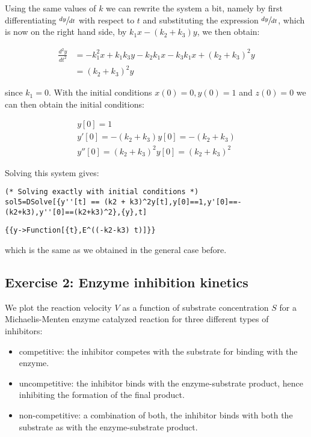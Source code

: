 \documentclass[11pt,a4paper,onecolumn]{article}
\begin{document}
Using the same values of $k$ we can rewrite the system a bit, namely by first differentiating $\sfrac{dy}{dt}$ with respect to $t$ and substituting the expression $\sfrac{dy}{dt}$, which is now on the right hand side, by $k_1 x - (k_2 + k_3) y$, we then obtain:

\begin{align*}
  \frac{d^2 y}{dt^2} &= -k_1^2 x + k_1 k_3 y - k_2 k_1 x - k_3 k_1 x + (k_2 + k_3)^2 y \nonumber \\
  &= (k_2 + k_3)^2 y
\end{align*}

since $k_1 = 0$. With the initial conditions $x(0) = 0, y(0) = 1$ and $z(0) = 0$ we can then obtain the initial conditions:

\begin{align*}
  y[0] = 1 \nonumber \\
  y'[0] = - (k_2 + k_3) y[0] = - (k_2 + k_3) \nonumber \\
  y''[0] = (k_2 + k_3)^2 y[0] = (k_2 + k_3)^2
\end{align*}

Solving this system gives:

\begin{lstlisting}[mathescape]
(* Solving exactly with initial conditions *)
sol5=DSolve[{y''[t] == (k2 + k3)^2y[t],y[0]==1,y'[0]==-(k2+k3),y''[0]==(k2+k3)^2},{y},t] 
\end{lstlisting}

\begin{lstlisting}[mathescape]
{{y->Function[{t},E^((-k2-k3) t)]}}
\end{lstlisting}

which is the same as we obtained in the general case before.

\subsection{Exercise 2: Enzyme inhibition kinetics}
We plot the reaction velocity $V$ as a function of substrate concentration $S$ for a Michaelis-Menten enzyme catalyzed reaction for three different types of inhibitors:

\begin{itemize}
\item 
  competitive: the inhibitor competes with the substrate for binding with the enzyme.
\item
  uncompetitive: the inhibitor binds with the enzyme-substrate product, hence inhibiting the formation of the final product.
\item
  non-competitive: a combination of both, the inhibitor binds with both the substrate as with the enzyme-substrate product.
\end{itemize}
\end{document}
